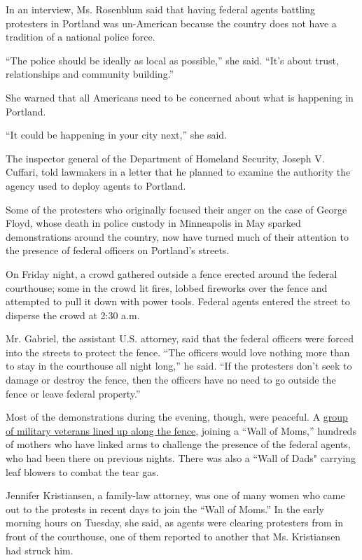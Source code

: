 In an interview, Ms. Rosenblum said that having federal agents battling
protesters in Portland was un-American because the country does not have
a tradition of a national police force.

``The police should be ideally as local as possible,'' she said. ``It's
about trust, relationships and community building.''

She warned that all Americans need to be concerned about what is
happening in Portland.

``It could be happening in your city next,'' she said.

The inspector general of the Department of Homeland Security, Joseph V.
Cuffari, told lawmakers in a letter that he planned to examine the
authority the agency used to deploy agents to Portland.

Some of the protesters who originally focused their anger on the case of
George Floyd, whose death in police custody in Minneapolis in May
sparked demonstrations around the country, now have turned much of their
attention to the presence of federal officers on Portland's streets.

On Friday night, a crowd gathered outside a fence erected around the
federal courthouse; some in the crowd lit fires, lobbed fireworks over
the fence and attempted to pull it down with power tools. Federal agents
entered the street to disperse the crowd at 2:30 a.m.

Mr. Gabriel, the assistant U.S. attorney, said that the federal officers
were forced into the streets to protect the fence. ``The officers would
love nothing more than to stay in the courthouse all night long,'' he
said. ``If the protesters don't seek to damage or destroy the fence,
then the officers have no need to go outside the fence or leave federal
property.''

Most of the demonstrations during the evening, though, were peaceful. A
\href{https://www.nytimes.com/2020/07/25/us/a-wall-of-vets-joins-the-front-lines-of-portland-protests.html}{group
of military veterans lined up along the fence}, joining a ``Wall of
Moms,'' hundreds of mothers who have linked arms to challenge the
presence of the federal agents, who had been there on previous nights.
There was also a ``Wall of Dads" carrying leaf blowers to combat the
tear gas.

Jennifer Kristiansen, a family-law attorney, was one of many women who
came out to the protests in recent days to join the ``Wall of Moms.'' In
the early morning hours on Tuesday, she said, as agents were clearing
protesters from in front of the courthouse, one of them reported to
another that Ms. Kristiansen had struck him.

